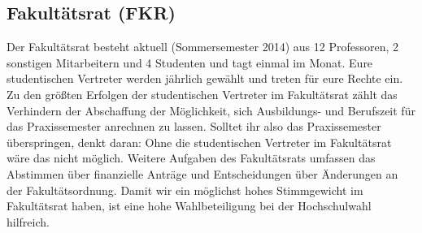 \subsection{Fakultätsrat (FKR)}
Der Fakultätsrat besteht aktuell (Sommersemester 2014) aus 12 
Professoren, 2 sonstigen Mitarbeitern und 4 Studenten und tagt einmal 
im Monat. Eure studentischen Vertreter werden jährlich gewählt und 
treten für eure Rechte ein. \doublebreak
Zu den größten Erfolgen der studentischen Vertreter im Fakultätsrat 
zählt das Verhindern der Abschaffung der Möglichkeit, sich Ausbildungs- und Berufszeit für das Praxissemester anrechnen zu lassen. Solltet ihr also das 
Praxissemester überspringen, denkt daran: Ohne die studentischen 
Vertreter im Fakultätsrat wäre das nicht möglich. Weitere Aufgaben 
des Fakultätsrats umfassen das Abstimmen über finanzielle Anträge 
und Entscheidungen über Änderungen an der Fakultätsordnung. Damit 
wir ein möglichst hohes Stimmgewicht im Fakultätsrat haben, ist eine 
hohe Wahlbeteiligung bei der Hochschulwahl hilfreich. 